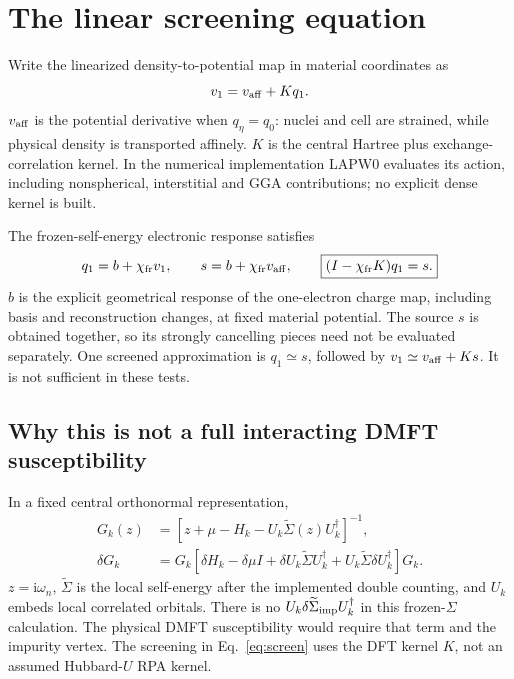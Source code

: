 \documentclass[11pt]{article}
\newcommand{\ii}{\mathrm i}
\begin{document}
\section{The linear screening equation}
Write the linearized density-to-potential map in material coordinates as
\begin{equation}
 v_1=v_{\rm aff}+Kq_1.
 \label{eq:potential}
\end{equation}
$v_{\rm aff}$ is the potential derivative when $q_\eta=q_0$: nuclei and
cell are strained, while physical density is transported affinely.
$K$ is the central Hartree plus exchange-correlation kernel. In the numerical
implementation LAPW0 evaluates its action, including nonspherical,
interstitial and GGA contributions; no explicit dense kernel is built.

The frozen-self-energy electronic response satisfies
\begin{equation}
 q_1=b+\chi_{\rm fr}v_1,
 \qquad
 s=b+\chi_{\rm fr}v_{\rm aff},
 \qquad
 \boxed{(I-\chi_{\rm fr}K)q_1=s.}
 \label{eq:screen}
\end{equation}
$b$ is the explicit geometrical response of the one-electron charge map,
including basis and reconstruction changes, at fixed material potential.
The source $s$ is obtained together, so its strongly cancelling pieces need
not be evaluated separately. One screened approximation is $q_1\simeq s$,
followed by $v_1\simeq v_{\rm aff}+Ks$. It is not sufficient in these tests.

\subsection*{Why this is not a full interacting DMFT susceptibility}
In a fixed central orthonormal representation,
\begin{align}
 G_k(z)&=[z+\mu-H_k-U_k\widetilde\Sigma(z)U_k^\dagger]^{-1},\\
 \delta G_k&=G_k\left[\delta H_k-\delta\mu I
  +\delta U_k\widetilde\Sigma U_k^\dagger
  +U_k\widetilde\Sigma\delta U_k^\dagger\right]G_k.
 \label{eq:dg}
\end{align}
$z=\ii\omega_n$, $\widetilde\Sigma$ is the local self-energy after the
implemented double counting, and $U_k$ embeds local correlated orbitals.
There is no $U_k\delta\widetilde\Sigma_{\rm imp}U_k^\dagger$ in this
frozen-$\Sigma$ calculation. The physical DMFT susceptibility would require
that term and the impurity vertex. The screening in Eq.~\eqref{eq:screen}
uses the DFT kernel $K$, not an assumed Hubbard-$U$ RPA kernel.
\end{document}
